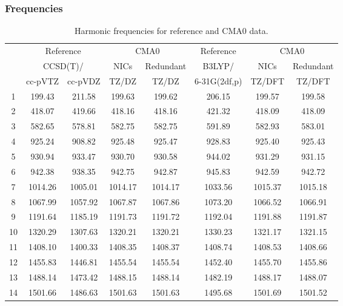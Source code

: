\documentclass[10pt,oneside]{article}
\begin{document}
\begin{table}[h!]
\subsubsection*{Frequencies}
\centering
\caption{Harmonic frequencies for reference and CMA0 data.}
\begin{tabular}{cccccccc}
\toprule
{} & \multicolumn{2}{c}{Reference} & \multicolumn{2}{c}{CMA0} &    Reference & \multicolumn{2}{c}{CMA0} \\
{} & \multicolumn{2}{c}{CCSD(T)/} &    NICs &  Redundant &       B3LYP/ &    NICs & Redundant \\
{} &   cc-pVTZ & cc-pVDZ &   TZ/DZ &      TZ/DZ & 6-31G(2df,p) &  TZ/DFT &    TZ/DFT \\
\midrule
1  &    199.43 &  211.58 &  199.63 &     199.62 &       206.15 &  199.57 &    199.58 \\
2  &    418.07 &  419.66 &  418.16 &     418.16 &       421.32 &  418.09 &    418.09 \\
3  &    582.65 &  578.81 &  582.75 &     582.75 &       591.89 &  582.93 &    583.01 \\
4  &    925.24 &  908.82 &  925.48 &     925.47 &       928.83 &  925.40 &    925.43 \\
5  &    930.94 &  933.47 &  930.70 &     930.58 &       944.02 &  931.29 &    931.15 \\
6  &    942.38 &  938.35 &  942.75 &     942.87 &       945.83 &  942.59 &    942.72 \\
7  &   1014.26 & 1005.01 & 1014.17 &    1014.17 &      1033.56 & 1015.37 &   1015.18 \\
8  &   1067.99 & 1057.92 & 1067.87 &    1067.86 &      1073.20 & 1066.52 &   1066.91 \\
9  &   1191.64 & 1185.19 & 1191.73 &    1191.72 &      1192.04 & 1191.88 &   1191.87 \\
10 &   1320.29 & 1307.63 & 1320.21 &    1320.21 &      1330.23 & 1321.17 &   1321.15 \\
11 &   1408.10 & 1400.33 & 1408.35 &    1408.37 &      1408.74 & 1408.53 &   1408.66 \\
12 &   1455.83 & 1446.81 & 1455.54 &    1455.54 &      1452.40 & 1455.70 &   1455.86 \\
13 &   1488.14 & 1473.42 & 1488.15 &    1488.14 &      1482.19 & 1488.17 &   1488.07 \\
14 &   1501.66 & 1486.63 & 1501.63 &    1501.63 &      1495.68 & 1501.69 &   1501.52 \\

\end{tabular}
\end{table}
\end{document}
